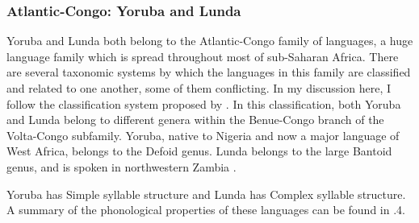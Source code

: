 \subsubsection{{Atlantic-Congo:} {Yoruba} {and} {Lunda}}\label{sec:8.4.3.4}

  Yoruba and Lunda both belong to the Atlantic-Congo family of languages, a huge language family which is spread throughout most of sub-Saharan Africa. There are several taxonomic systems by which the languages in this family are classified and related to one another, some of them conflicting. In my discussion here, I follow the classification system proposed by \citet{Williamson1989}. In this classification, both Yoruba and Lunda belong to different genera within the Benue-Congo branch of the Volta-Congo subfamily. Yoruba, native to Nigeria and now a major language of West Africa, belongs to the Defoid genus. Lunda belongs to the large Bantoid genus, and is spoken in northwestern Zambia \citep{Kawasha2003}.

  Yoruba has Simple syllable structure and Lunda has Complex syllable structure. A summary of the phonological properties of these languages can be found in .4.

